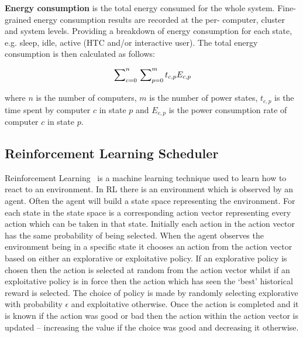 \documentclass[10pt, conference, compsocconf]{IEEEtran}
\begin{document}
\textbf{Energy consumption} is the total energy consumed for the whole system. Fine-grained energy consumption results are recorded at the per- computer, cluster and system levels. Providing a breakdown of energy consumption for each state, e.g. sleep, idle, active (HTC and/or interactive user). The total energy consumption is then calculated as follows:

\begin{equation}
\sideset{}{^n_{c=0}}\sum \sideset{}{^m_{p=0}}\sum t_{c,p} E_{c,p}
\end{equation}

\noindent where $n$ is the number of computers, $m$ is the number of power states, $t_{c,p}$ is the time spent by computer $c$ in state $p$ and $E_{c,p}$ is the power consumption rate of computer $c$ in state $p$.





\subsection{Reinforcement Learning Scheduler}

Reinforcement Learning~\cite{rl} is a machine learning technique used to learn how to react to an environment. In RL there is an environment which is observed by an agent. Often the agent will build a state space representing the environment. For each state in the state space is a corresponding action vector representing every action which can be taken in that state. Initially each action in the action vector has the same probability of being selected. When the agent observes the environment being in a specific state it chooses an action from the action vector based on either an explorative or exploitative policy. If an explorative policy is chosen then the action is selected at random from the action vector whilst if an exploitative policy is in force then the action which has seen the `best' historical reward is selected. The choice of policy is made by randomly selecting explorative with probability $\epsilon$ and exploitative otherwise. Once the action is completed and it is known if the action was good or bad then the action within the action vector is updated -- increasing the value if the choice was good and decreasing it otherwise.
\end{document}
